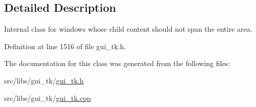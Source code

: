 \subsection{Detailed Description}
Internal class for windows whose child content should not span the entire area. 

Definition at line 1516 of file gui\-\_\-tk.\-h.



The documentation for this class was generated from the following files\-:\begin{DoxyCompactItemize}
\item 
src/libs/gui\-\_\-tk/\hyperlink{gui__tk_8h}{gui\-\_\-tk.\-h}\item 
src/libs/gui\-\_\-tk/\hyperlink{gui__tk_8cpp}{gui\-\_\-tk.\-cpp}\end{DoxyCompactItemize}
